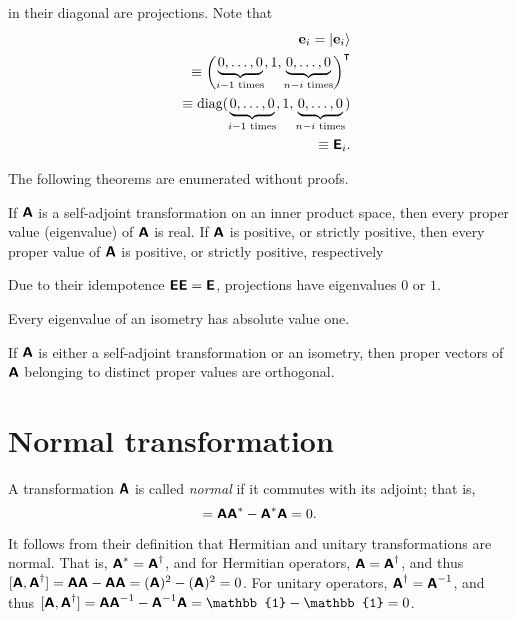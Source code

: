 {in their diagonal are  projections.
Note that
\begin{equation}
\begin{split}
{\bf e}_i=\vert {\bf e}_i \rangle  \\
\quad \equiv \begin{pmatrix} \underbrace{0,\ldots , 0}_{i-1 \textrm{ times}}, 1, \underbrace{0,\ldots , 0}_{n-i \textrm{ times}} \end{pmatrix}^\intercal    \\
\quad \equiv  \textrm{diag}(  \underbrace{0,\ldots , 0}_{i-1 \textrm{ times}}, 1, \underbrace{0,\ldots , 0}_{n-i \textrm{ times}}  )
  \\
\quad \equiv  \textsf{\textbf{E}}_{i}.
\end{split}
\end{equation}
{\textrm{\eexample}}
}


The following theorems are enumerated without proofs.

If $\textsf{\textbf{A}}$
is a self-adjoint transformation on an inner product space, then every proper value (eigenvalue)  of $\textsf{\textbf{A}}$
is real.
If $\textsf{\textbf{A}}$ is positive, or strictly positive,
then every proper value of  $\textsf{\textbf{A}}$ is positive, or strictly positive, respectively

Due to their idempotence $\textsf{\textbf{E}}\textsf{\textbf{E}}=\textsf{\textbf{E}}$,
projections have eigenvalues $0$ or $1$.

Every eigenvalue of an isometry has absolute value one.

If  $\textsf{\textbf{A}}$  is either a self-adjoint transformation or an isometry,
then proper vectors of $ \textsf{\textbf{A}}$
belonging to distinct proper values are orthogonal.


\section{Normal transformation}
\label{2014-m-fdvs-normality}

A transformation $\textsf{\textbf{A}}$ is called {\em normal}
if it commutes with its adjoint; that is,
\begin{equation}
[\textsf{\textbf{A}},\textsf{\textbf{A}}^\ast ]= \textsf{\textbf{A}}\textsf{\textbf{A}}^\ast  -
\textsf{\textbf{A}}^\ast  \textsf{\textbf{A}} =0.
\end{equation}


It follows from their definition that Hermitian and unitary transformations are normal. That is,
$\textsf{\textbf{A}}^\ast =\textsf{\textbf{A}}^\dagger$,
and for Hermitian operators,
$\textsf{\textbf{A}}=\textsf{\textbf{A}}^\dagger$,
and thus
$[\textsf{\textbf{A}},\textsf{\textbf{A}}^\dagger]= \textsf{\textbf{A}}\textsf{\textbf{A}} -
\textsf{\textbf{A}} \textsf{\textbf{A}} =(\textsf{\textbf{A}})^2 -(\textsf{\textbf{A}})^2=0$.
For unitary operators,
$\textsf{\textbf{A}}^\dagger =\textsf{\textbf{A}}^{-1}$,
and thus
$[\textsf{\textbf{A}},\textsf{\textbf{A}}^\dagger]= \textsf{\textbf{A}}\textsf{\textbf{A}}^{-1} -
\textsf{\textbf{A}}^{-1} \textsf{\textbf{A}} =\mathbb{1} -\mathbb{1} =0$.


